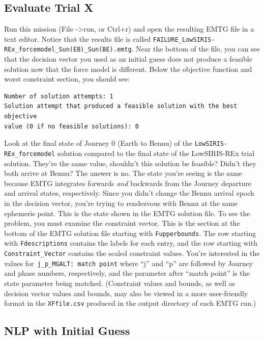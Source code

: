\documentclass[11pt]{article}
\begin{document}
\subsection{Evaluate Trial X}
\label{sec:evaluate_trial_x}

Run this mission (File -\textgreater run, or Ctrl+r) and open the resulting \ac{EMTG} file in a text editor. Notice that the results file is called \texttt{FAILURE\_LowSIRIS-REx\_forcemodel\_Sun(EB)\_Sun(BE).emtg}. Near the bottom of the file, you can see that the decision vector you used as an initial guess does not produce a feasible solution now that the force model is different. Below the objective function and worst constraint section, you should see:

\begin{lstlisting}
Number of solution attempts: 1
Solution attempt that produced a feasible solution with the best objective 
value (0 if no feasible solutions): 0
\end{lstlisting}

\noindent Look at the final state of Journey 0 (Earth to Bennu) of the \texttt{LowSIRIS-REx\_forcemodel} solution compared to the final state of the LowSIRIS-REx trial solution. They’re the same value, shouldn't this solution be feasible? Didn’t they both arrive at Bennu? The answer is no. The state you’re seeing is the same because EMTG integrates forwards \textit{and} backwards from the Journey departure and arrival states, respectively. Since you didn’t change the Bennu arrival epoch in the decision vector, you’re trying to rendezvous with Bennu at the same ephemeris point. This is the state shown in the \ac{EMTG} solution file. To see the problem, you must examine the constraint vector. This is the section at the bottom of the \ac{EMTG} solution file starting with \texttt{Fupperbounds}. The row starting with \texttt{Fdescriptions} contains the labels for each entry, and the row starting with \texttt{Constraint\_Vector} contains the scaled constraint values. You’re interested in the values for\texttt{ j\_p\_MGALT: match point} where ``j'' and ``p'' are followed by Journey and phase numbers, respectively, and the parameter after ``match point'' is the state parameter being matched. (Constraint values and bounds, as well as decision vector values and bounds, may also be viewed in a more user-friendly format in the \texttt{XFfile.csv} produced in the output directory of each \ac{EMTG} run.)

\subsection{NLP with Initial Guess}
\label{sec:nlp_with_initial_guess}
\end{document}

